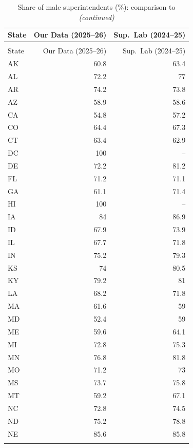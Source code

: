 \begingroup\fontsize{9}{11}\selectfont

\begin{longtable}[t]{lrr}
\caption{\label{tab:gender_comparison}Share of male superintendents (\%): comparison to \citet{superintendentlab}}\\
\toprule
State & Our Data (2025--26) & Sup.\ Lab (2024--25)\\
\midrule
\endfirsthead
\caption[]{Share of male superintendents (\%): comparison to \citet{superintendentlab} \textit{(continued)}}\\
\toprule
State & Our Data (2025--26) & Sup.\ Lab (2024--25)\\
\midrule
\endhead

\endfoot
\bottomrule
\endlastfoot
AK & 60.8 & 63.4\\
AL & 72.2 & 77\\
AR & 74.2 & 73.8\\
AZ & 58.9 & 58.6\\
CA & 54.8 & 57.2\\
\addlinespace
CO & 64.4 & 67.3\\
CT & 63.4 & 62.9\\
DC & 100 & --\\
DE & 72.2 & 81.2\\
FL & 71.2 & 71.1\\
\addlinespace
GA & 61.1 & 71.4\\
HI & 100 & --\\
IA & 84 & 86.9\\
ID & 67.9 & 73.9\\
IL & 67.7 & 71.8\\
\addlinespace
IN & 75.2 & 79.3\\
KS & 74 & 80.5\\
KY & 79.2 & 81\\
LA & 68.2 & 71.8\\
MA & 61.6 & 59\\
\addlinespace
MD & 52.4 & 59\\
ME & 59.6 & 64.1\\
MI & 72.8 & 75.3\\
MN & 76.8 & 81.8\\
MO & 71.2 & 73\\
\addlinespace
MS & 73.7 & 75.8\\
MT & 59.2 & 67.1\\
NC & 72.8 & 74.5\\
ND & 75.2 & 78.8\\
NE & 85.6 & 85.8\\
\addlinespace

\end{longtable}
